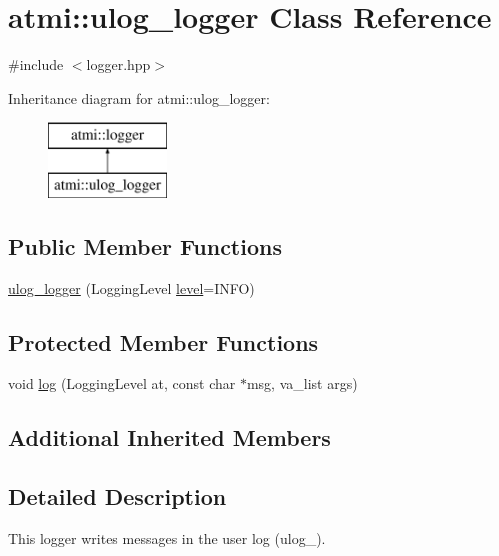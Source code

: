 \hypertarget{classatmi_1_1ulog__logger}{\section{atmi\+:\+:ulog\+\_\+logger Class Reference}
\label{classatmi_1_1ulog__logger}
}


{\ttfamily \#include $<$logger.\+hpp$>$}

Inheritance diagram for atmi\+:\+:ulog\+\_\+logger\+:\begin{figure}[H]
\begin{center}
\leavevmode
\includegraphics[height=2.000000cm]{classatmi_1_1ulog__logger}
\end{center}
\end{figure}
\subsection*{Public Member Functions}
\begin{DoxyCompactItemize}
\item 
\hyperlink{classatmi_1_1ulog__logger_ab8c093b492bff137bf6cec6a9e9daa71}{ulog\+\_\+logger} (Logging\+Level \hyperlink{classatmi_1_1logger_a70bf3a05b911b63d4548507fdea5dfbd}{level}=I\+N\+F\+O)
\end{DoxyCompactItemize}
\subsection*{Protected Member Functions}
\begin{DoxyCompactItemize}
\item 
void \hyperlink{classatmi_1_1ulog__logger_a30dce356534da360945564d14fbe0da8}{log} (Logging\+Level at, const char $\ast$msg, va\+\_\+list args)
\end{DoxyCompactItemize}
\subsection*{Additional Inherited Members}


\subsection{Detailed Description}
This logger writes messages in the user log (ulog\+\_\+).

